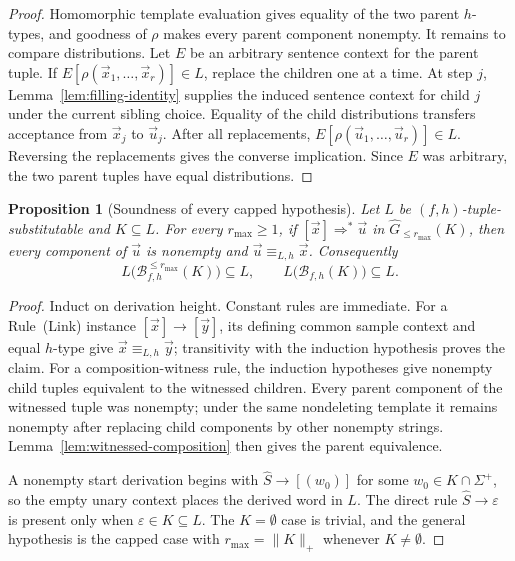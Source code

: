 \documentclass[11pt]{article}
\numberwithin{equation}{section}
\theoremstyle{plain}
\newtheorem{proposition}[theorem]{Proposition}
\theoremstyle{definition}
\theoremstyle{remark}
\newcommand{\tuple}[1]{\vec{#1}}
\newcommand{\eps}{\varepsilon}
\begin{document}
\begin{proof}
Homomorphic template evaluation gives equality of the two parent $h$-types,
and goodness of $\rho$ makes every parent component nonempty.  It remains to
compare distributions.  Let $E$ be an arbitrary sentence context for the
parent tuple.  If
$E[\rho(\tuple x_1,\ldots,\tuple x_r)]\in L$, replace the children one at
a time.  At step $j$, Lemma~\ref{lem:filling-identity} supplies the induced
sentence context for child $j$ under the current sibling choice.  Equality of
the child distributions transfers acceptance from $\tuple x_j$ to
$\tuple u_j$.  After all replacements,
$E[\rho(\tuple u_1,\ldots,\tuple u_r)]\in L$.  Reversing the replacements
gives the converse implication.  Since $E$ was arbitrary, the two parent
tuples have equal distributions.
\end{proof}

\begin{proposition}[Soundness of every capped hypothesis]
\label{prop:reconstruction-soundness}
Let $L$ be $(f,h)$-tuple-substitutable and $K\subseteq L$.  For every
$r_{\max}\ge1$, if $[\tuple x]\Rightarrow^*\tuple u$ in
$\widehat G_{\le r_{\max}}(K)$, then every component of $\tuple u$ is nonempty
and $\tuple u\equiv_{L,h}\tuple x$.  Consequently
\[
 L\bigl(\mathcal B_{f,h}^{\le r_{\max}}(K)\bigr)\subseteq L,
 \qquad L\bigl(\mathcal B_{f,h}(K)\bigr)\subseteq L.
\]
\end{proposition}

\begin{proof}
Induct on derivation height.  Constant rules are immediate.  For a Rule~(Link) instance $[\tuple x]\to[\tuple y]$, its defining common sample context and
equal $h$-type give $\tuple x\equiv_{L,h}\tuple y$; transitivity with the
induction hypothesis proves the claim.  For a composition-witness rule, the
induction hypotheses give nonempty child tuples equivalent to the witnessed
children.  Every parent component of the witnessed tuple was nonempty; under
the same nondeleting template it remains nonempty after replacing child
components by other nonempty strings.  Lemma~\ref{lem:witnessed-composition}
then gives the parent equivalence.

A nonempty start derivation begins with $\widehat S\to[(w_0)]$ for some
$w_0\in K\cap\Sigma^+$, so the empty unary context places the derived word in
$L$.  The direct rule $\widehat S\to\eps$ is present only when
$\eps\in K\subseteq L$.  The $K=\emptyset$ case is trivial, and the general
hypothesis is the capped case with $r_{\max}=\|K\|_+$ whenever $K\ne\emptyset$.
\end{proof}
\end{document}
